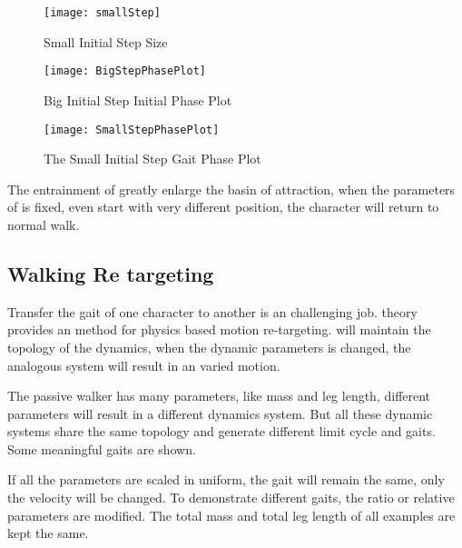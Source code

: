 \begin{figure}[!htbp]
  \begin{center}
      \texttt{[image: smallStep]}
    \caption{Small Initial Step Size}
    \label{fig:smallStepini}
\end{center}
\end{figure}


\begin{figure}[!htbp]
  \begin{center}
      \texttt{[image: BigStepPhasePlot]}
    \caption{Big Initial Step Initial Phase Plot}
    \label{fig:bigstepiniGaitPlot}
\end{center}
\end{figure}


\begin{figure}[!htbp]
  \begin{center}
      \texttt{[image: SmallStepPhasePlot]}
    \caption{The Small Initial Step Gait Phase Plot}
    \label{fig:smallstepiniPhasePlot}
\end{center}
\end{figure}

The entrainment of \cpg greatly enlarge the basin of attraction, when the parameters of \cpg is fixed, even start with very different position, the character will return to normal walk.





\subsection{Walking Re targeting}
Transfer the gait of one character to another is an challenging job.
\moit theory provides an method for physics based motion re-targeting.
\cpg will maintain the topology of the dynamics, when the dynamic parameters is changed, the analogous system will result in an varied motion.

The passive walker has many parameters, like mass and leg length, different parameters will result in a different dynamics system.
But all these dynamic systems  share the same topology and generate different limit cycle and gaits.
Some meaningful gaits are shown.

If all the parameters are scaled in uniform, the gait will remain the same, only the velocity will be changed.
To demonstrate different gaits, the ratio or relative parameters are modified. 
The total mass and total leg length of all examples are kept the same.



